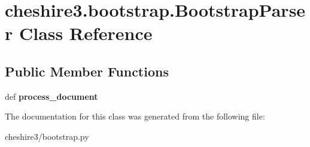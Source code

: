 \hypertarget{classcheshire3_1_1bootstrap_1_1_bootstrap_parser}{\section{cheshire3.\-bootstrap.\-Bootstrap\-Parser Class Reference}
\label{classcheshire3_1_1bootstrap_1_1_bootstrap_parser}
}
\subsection*{Public Member Functions}
\begin{DoxyCompactItemize}
\item 
\hypertarget{classcheshire3_1_1bootstrap_1_1_bootstrap_parser_a1449d071d8881cdf1848dfab9dc155a1}{def {\bfseries process\-\_\-document}}\label{classcheshire3_1_1bootstrap_1_1_bootstrap_parser_a1449d071d8881cdf1848dfab9dc155a1}

\end{DoxyCompactItemize}


The documentation for this class was generated from the following file\-:\begin{DoxyCompactItemize}
\item 
cheshire3/bootstrap.\-py\end{DoxyCompactItemize}
